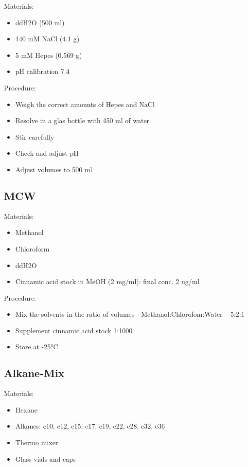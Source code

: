 \documentclass[]{book}
\providecommand{\tightlist}{%
  \setlength{\itemsep}{0pt}\setlength{\parskip}{0pt}}
\theoremstyle{definition}
\theoremstyle{definition}
\theoremstyle{definition}
\theoremstyle{remark}
\begin{document}
Materials:

\begin{itemize}
\tightlist
\item
  ddH2O (500 ml)
\item
  140 mM NaCl (4.1 g)
\item
  5 mM Hepes (0.569 g)
\item
  pH calibration 7.4
\end{itemize}

Procedure:

\begin{itemize}
\tightlist
\item
  Weigh the correct amounts of Hepes and NaCl
\item
  Resolve in a glas bottle with 450 ml of water
\item
  Stir carefully
\item
  Check and adjust pH
\item
  Adjust volumes to 500 ml
\end{itemize}

\subsection{MCW}\label{mcw}

Materials:

\begin{itemize}
\tightlist
\item
  Methanol
\item
  Chloroform
\item
  ddH2O
\item
  Cinnamic acid stock in MeOH (2 mg/ml): final conc. 2 ug/ml
\end{itemize}

Procedure:

\begin{itemize}
\tightlist
\item
  Mix the solvents in the ratio of volumes - Methanol:Chlorofom:Water --
  5:2:1
\item
  Supplement cinnamic acid stock 1:1000
\item
  Store at -25°C
\end{itemize}

\subsection{Alkane-Mix}\label{alkanemix}

Materials:

\begin{itemize}
\tightlist
\item
  Hexane
\item
  Alkanes: c10, c12, c15, c17, c19, c22, c28, c32, c36
\item
  Thermo mixer
\item
  Glass vials and caps
\end{itemize}
\end{document}
